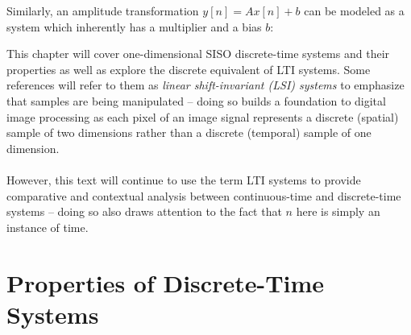 \documentclass{report}
\begin{document}
Similarly, an amplitude transformation 
$y[n]=Ax[n]+b$ can be modeled as a system which inherently has a multiplier and a bias $b$:
\begin{center}
\end{center}

This chapter will cover one-dimensional SISO discrete-time systems and their properties as well as explore 
the discrete equivalent of LTI systems. Some references will refer to them as \emph{linear shift-invariant (LSI) systems} 
to emphasize that samples are being manipulated -- doing so builds a foundation to digital image processing 
as each pixel of an image signal represents a discrete (spatial) sample of two dimensions 
rather than a discrete (temporal) sample of one dimension.
\\ \\
However, this text will continue to use the term LTI systems to provide comparative and contextual analysis between 
continuous-time and discrete-time systems -- doing so also draws attention to the fact that $n$ here is simply an instance of time.

\section{Properties of Discrete-Time Systems}
\end{document}
